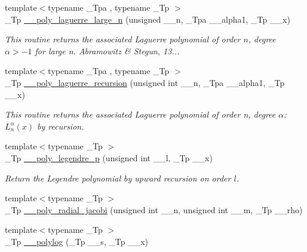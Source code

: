 \begin{DoxyCompactItemize}
{\footnotesize template$<$typename \+\_\+\+Tpa , typename \+\_\+\+Tp $>$ }\\\+\_\+\+Tp \hyperlink{namespacestd_1_1____detail_a1f9e78deb2bcc73511c77dcb1cdcf4c8}{\+\_\+\+\_\+poly\+\_\+laguerre\+\_\+large\+\_\+n} (unsigned \+\_\+\+\_\+n, \+\_\+\+Tpa \+\_\+\+\_\+alpha1, \+\_\+\+Tp \+\_\+\+\_\+x)
\begin{DoxyCompactList}\small\item\em This routine returns the associated Laguerre polynomial of order $ n $, degree $ \alpha > -1 $ for large n. Abramowitz \& Stegun, 13... \end{DoxyCompactList}\item 
{\footnotesize template$<$typename \+\_\+\+Tpa , typename \+\_\+\+Tp $>$ }\\\+\_\+\+Tp \hyperlink{namespacestd_1_1____detail_a6d3a7499bd109d5c0ea01e85f3165730}{\+\_\+\+\_\+poly\+\_\+laguerre\+\_\+recursion} (unsigned int \+\_\+\+\_\+n, \+\_\+\+Tpa \+\_\+\+\_\+alpha1, \+\_\+\+Tp \+\_\+\+\_\+x)
\begin{DoxyCompactList}\small\item\em This routine returns the associated Laguerre polynomial of order {\ttfamily n}, degree {\ttfamily $ \alpha $}\+: $ L_n^\alpha(x) $ by recursion. \end{DoxyCompactList}\item 
{\footnotesize template$<$typename \+\_\+\+Tp $>$ }\\\+\_\+\+Tp \hyperlink{namespacestd_1_1____detail_ad340d3fb1a429356292e7dcf61348c8a}{\+\_\+\+\_\+poly\+\_\+legendre\+\_\+p} (unsigned int \+\_\+\+\_\+l, \+\_\+\+Tp \+\_\+\+\_\+x)
\begin{DoxyCompactList}\small\item\em Return the Legendre polynomial by upward recursion on order $ l $. \end{DoxyCompactList}\item 
{\footnotesize template$<$typename \+\_\+\+Tp $>$ }\\\+\_\+\+Tp \hyperlink{namespacestd_1_1____detail_af325d47042bc9661bbde61b13f368fec}{\+\_\+\+\_\+poly\+\_\+radial\+\_\+jacobi} (unsigned int \+\_\+\+\_\+n, unsigned int \+\_\+\+\_\+m, \+\_\+\+Tp \+\_\+\+\_\+rho)
\item 
{\footnotesize template$<$typename \+\_\+\+Tp $>$ }\\\+\_\+\+Tp \hyperlink{namespacestd_1_1____detail_a17fb8cea11706f319aaea277188a29c8}{\+\_\+\+\_\+polylog} (\+\_\+\+Tp \+\_\+\+\_\+s, \+\_\+\+Tp \+\_\+\+\_\+x)
\item 

\end{DoxyCompactItemize}
